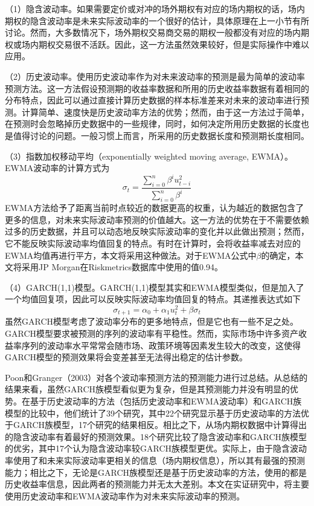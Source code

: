 （1）隐含波动率。如果需要定价或对冲的场外期权有对应的场内期权的话，场内期权的隐含波动率是未来实际波动率的一个很好的估计，具体原理在上一小节有所讨论。然而，大多数情况下，场外期权交易商交易的期权一般都没有对应的场内期权或场内期权交易很不活跃。因此，这一方法虽然效果较好，但是实际操作中难以应用。

（2）历史波动率。使用历史波动率作为对未来波动率的预测是最为简单的波动率预测方法。这一方法假设预测期的收益率数据和所用的历史收益率数据有着相同的分布特点，因此可以通过直接计算历史数据的样本标准差来对未来的波动率进行预测。计算简单、速度快是历史波动率方法的优势；然而，由于这一方法过于简单，在预测时会忽略掉历史数据中的一些规律，同时，如何决定所用历史数据的长度也是值得讨论的问题。一般习惯上而言，所采用的历史数据长度和预测期长度相同。

（3）指数加权移动平均（exponentially weighted moving average, EWMA）。EWMA波动率的计算方式为
\begin{equation}
  \sigma_t=\frac{\sum_{i=0}^n \beta^iu_{t-i}^2}{\sum_{i=0}^n \beta^i}
\end{equation}
EWMA方法给予了距离当前时点较近的数据更高的权重，认为越近的数据包含了更多的信息，对未来实际波动率预测的价值越大。这一方法的优势在于不需要依赖过多的历史数据，并且可以动态地反映实际波动率的变化并以此做出预测；然而，它不能反映实际波动率均值回复的特点。有时在计算时，会将收益率减去对应的EWMA均值再进行平方，本文将采用这种做法。对于EWMA公式中$\beta$的确定，本文将采用JP Morgan在Riskmetrics数据库中使用的值0.94。

（4）GARCH(1,1)模型。GARCH(1,1)模型其实和EWMA模型类似，但是加入了一个均值回复项，因此可以反映实际波动率均值回复的特点。其递推表达式如下
\begin{equation}
  \sigma_{t+1}=\alpha_0+\alpha_1u_t^2+\beta \sigma_t
\end{equation}
虽然GARCH模型考虑了波动率分布的更多地特点，但是它也有一些不足之处。GARCH模型要求被预测的序列的波动率有平稳性。然而，实际市场中许多资产收益率序列的波动率水平常常会随市场、政策环境等因素发生较大的改变，这使得GARCH模型的预测效果将会变差甚至无法得出稳定的估计参数。

Poon和Granger（2003）\cite{poon2003forecasting}对各个波动率预测方法的预测能力进行过总结。从总结的结果来看，虽然GARCH族模型看似更为复杂，但是其预测能力并没有明显的优势。在基于历史波动率的方法（包括历史波动率和EWMA波动率）和GARCH族模型的比较中，他们统计了39个研究，其中22个研究显示基于历史波动率的方法优于GARCH族模型，17个研究的结果相反。相比之下，从场内期权数据中计算得出的隐含波动率有着最好的预测效果。18个研究比较了隐含波动率和GARCH族模型的优劣，其中17个认为隐含波动率较GARCH族模型更优。实际上，由于隐含波动率使用了和未来实际波动率更相关的信息（场内期权信息），所以其有最强的预测能力；相比之下，无论是GARCH族模型还是基于历史波动率的方法，使用的都是历史收益率信息，因此两者的预测能力并无太大差别。本文在实证研究中，将主要使用历史波动率和EWMA波动率作为对未来实际波动率的预测。

